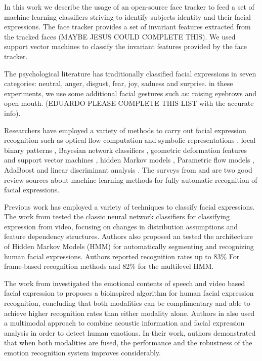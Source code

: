 \documentclass[]{article}
\begin{document}
In this work we describe the usage of an open-source face tracker to feed a set of machine learning classifiers striving
to identify subjects identity and their facial expressions. The face tracker provides a set of invariant features
extracted from the tracked faces (MAYBE JESUS COULD COMPLETE THIS). We used support vector machines 
to classify the invariant features provided by the face tracker.


The psychological literature has traditionally classified facial expressions in seven categories: neutral, anger, disgust, fear,
joy, sadness and surprise. in these experiments, we use some additional facial gestures such as: raising eyebrows and open mouth.
(EDUARDO PLEASE COMPLETE THIS LIST with the accurate info).


Researchers have employed a variety of methods to carry out facial expression recognition such as optical flow
computation  and symbolic representations \cite{Yacoob506414}, local binary patterns \cite{Shan2009803},  Bayesian
network classifiers \cite{Cohen1211408}, geometric deformation features and support vector machines
\cite{kotsia4032815}, hidden Markov models \cite{aleksic1597130, Cohen2003160}, Parametric flow models
\cite{blackAndYacoob}, AdaBoost and linear discriminant analysis \cite{bartlett1398364}. The surveys from
\cite{bartlett1398364} and \cite{Fasel2003259} are two good review sources about machine learning methods 
for fully automatic recognition of facial expressions. 


Previous work has employed a variety of techniques to classify  facial expressions. The work from \cite{Cohen2003160}
tested the classic neural network classifiers for classifying expression from video, focusing on changes in distribution
assumptions and feature dependency structures. Authors also proposed an tested the architecture of Hidden Markov Models
(HMM) for automatically segmenting and recognizing human facial expressions. Authors reported recognition rates up to
83\% For frame-based recognition methods and 82\% for the multilevel HMM.
 


The work from \cite{Chen670976} investigated the emotional contents of speech and video based facial expression to
proposes a bioinspired algorithm for human facial expression recognition, concluding that both modalities can be
complimentary and able to achieve higher recognition rates than either modality alone. Authors in \cite{Busso:2004} also
used a multimodal approach to combine acoustic information and facial expression analysis in order to detect human
emotions. In their work, authors demonstrated that when both modalities are fused, the performance and the robustness of
the emotion recognition system improves considerably.
\end{document}
